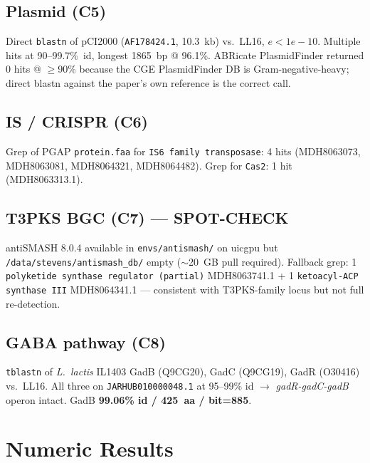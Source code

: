 \documentclass[11pt,a4paper]{article}
\begin{document}
\subsection{Plasmid (C5)}
Direct \texttt{blastn} of pCI2000 (\texttt{AF178424.1}, 10.3~kb) vs.\ LL16, $e{<}1e{-}10$. Multiple hits at 90--99.7\%~id, longest 1865~bp @ 96.1\%. ABRicate PlasmidFinder returned 0 hits @ $\geq$90\% because the CGE PlasmidFinder DB is Gram-negative-heavy; direct blastn against the paper's own reference is the correct call.

\subsection{IS / CRISPR (C6)}
Grep of PGAP \texttt{protein.faa} for \texttt{IS6 family transposase}: 4 hits (MDH8063073, MDH8063081, MDH8064321, MDH8064482). Grep for \texttt{Cas2}: 1 hit (MDH8063313.1).

\subsection{T3PKS BGC (C7) --- SPOT-CHECK}
antiSMASH 8.0.4 available in \texttt{envs/antismash/} on uicgpu but \texttt{/data/stevens/antismash\_db/} empty ($\sim$20~GB pull required). Fallback grep: 1 \texttt{polyketide synthase regulator (partial)} MDH8063741.1 + 1 \texttt{ketoacyl-ACP synthase III} MDH8064341.1 --- consistent with T3PKS-family locus but not full re-detection.

\subsection{GABA pathway (C8)}
\texttt{tblastn} of \textit{L.\ lactis} IL1403 GadB (Q9CG20), GadC (Q9CG19), GadR (O30416) vs.\ LL16. All three on \texttt{JARHUB010000048.1} at 95--99\% id $\to$ \emph{gadR-gadC-gadB} operon intact. GadB \textbf{99.06\% id / 425~aa / bit=885}.

\section{Numeric Results}
\end{document}
